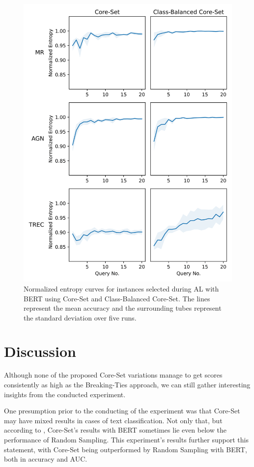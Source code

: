 \documentclass[english,bachelor,ul]{webisthesis} %
\begin{document}
\begin{figure}[htbp]
    \centering
    \includegraphics[scale=0.6]{img/entropy_plots-1.png}
    \caption{Normalized entropy curves for instances selected during AL with BERT using Core-Set and Class-Balanced Core-Set. The lines represent the mean accuracy and the surrounding tubes represent the standard deviation over five runs.}
    \label{fig:entropy-plot}
\end{figure}

\chapter{Discussion}

Although none of the proposed Core-Set variations manage to get scores consistently as high as the Breaking-Ties approach, we can still gather interesting insights from the conducted experiment. 

One presumption prior to the conducting of the experiment was that Core-Set may have mixed results in cases of text classification. Not only that, but according to \cite{DBLP:conf/kdd/0002MM21}, Core-Set's results with BERT sometimes lie even below the performance of Random Sampling. This experiment's results further support this statement, with Core-Set being outperformed by Random Sampling with BERT, both in accuracy and AUC.
\end{document}
